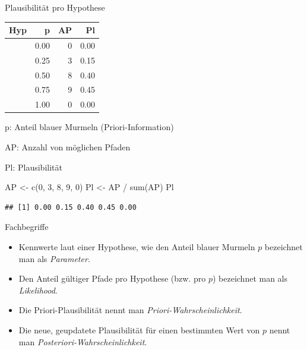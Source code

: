 \documentclass[
  ngerman,
  ignorenonframetext,
]{beamer}
\newenvironment{Shaded}{\begin{snugshade}}{\end{snugshade}}
\newcommand{\DecValTok}[1]{\textcolor[rgb]{0.00,0.00,0.81}{#1}}
\newcommand{\FunctionTok}[1]{\textcolor[rgb]{0.00,0.00,0.00}{#1}}
\newcommand{\NormalTok}[1]{#1}
\newcommand{\OtherTok}[1]{\textcolor[rgb]{0.56,0.35,0.01}{#1}}
\newcommand{\SpecialCharTok}[1]{\textcolor[rgb]{0.00,0.00,0.00}{#1}}
\begin{document}
\begin{frame}[fragile]{Plausibilität pro Hypothese}
\protect\hypertarget{plausibilituxe4t-pro-hypothese}{}
\begin{tabular}{l|r|r|r}
\hline
Hyp & p & AP & Pl\\
\hline
[W W W W] & 0.00 & 0 & 0.00\\
\hline
[B W W W] & 0.25 & 3 & 0.15\\
\hline
[B B W W] & 0.50 & 8 & 0.40\\
\hline
[B B B W] & 0.75 & 9 & 0.45\\
\hline
[B B B B] & 1.00 & 0 & 0.00\\
\hline
\end{tabular}

p: Anteil blauer Murmeln (Priori-Information)

AP: Anzahl von möglichen Pfaden

Pl: Plausibilität

\begin{Shaded}
\begin{Highlighting}[]
\NormalTok{AP }\OtherTok{\textless{}{-}} \FunctionTok{c}\NormalTok{(}\DecValTok{0}\NormalTok{, }\DecValTok{3}\NormalTok{, }\DecValTok{8}\NormalTok{, }\DecValTok{9}\NormalTok{, }\DecValTok{0}\NormalTok{)}
\NormalTok{Pl }\OtherTok{\textless{}{-}}\NormalTok{ AP }\SpecialCharTok{/} \FunctionTok{sum}\NormalTok{(AP)}
\NormalTok{Pl}
\end{Highlighting}
\end{Shaded}

\begin{verbatim}
## [1] 0.00 0.15 0.40 0.45 0.00
\end{verbatim}
\end{frame}

\begin{frame}{Fachbegriffe}
\protect\hypertarget{fachbegriffe}{}
\begin{itemize}
\item
  Kennwerte laut einer Hypothese, wie den Anteil blauer Murmeln \(p\)
  bezeichnet man als \emph{Parameter}.
\item
  Den Anteil gültiger Pfade pro Hypothese (bzw. pro \(p\)) bezeichnet
  man als \emph{Likelihood}.
\item
  Die Priori-Plausibilität nennt man \emph{Priori-Wahrscheinlichkeit}.
\item
  Die neue, geupdatete Plausibilität für einen bestimmten Wert von \(p\)
  nennt man \emph{Posteriori-Wahrscheinlichkeit}.
\end{itemize}
\end{frame}
\end{document}
